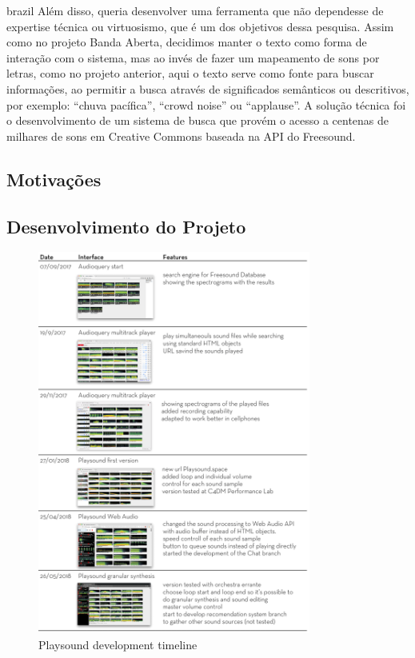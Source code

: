 \begin{otherlanguage*}{brazil}
Além disso, queria desenvolver uma ferramenta que não dependesse de expertise técnica ou virtuosismo, que é um dos objetivos dessa pesquisa. Assim como no projeto Banda Aberta, decidimos manter o texto como forma de interação com o sistema, mas ao invés de fazer um mapeamento de sons por letras, como no projeto anterior, aqui o texto serve como fonte para buscar informações, ao permitir a busca através de significados semânticos ou descritivos, por exemplo: ``chuva pacífica'', ``crowd noise'' ou ``applause''. A solução técnica foi o desenvolvimento de um sistema de busca que provém o acesso a centenas de milhares de sons em Creative Commons baseada na API do Freesound.

\subsection{Motivações}




\subsection{Desenvolvimento do Projeto}


\begin{figure}
\centering
\includegraphics[width=0.8\textwidth]{pictures/playsoundtimeline}
\caption{\label{pstimeline}Playsound development timeline}
\label{fig:timeline}
\end{figure}


\end{otherlanguage*}
